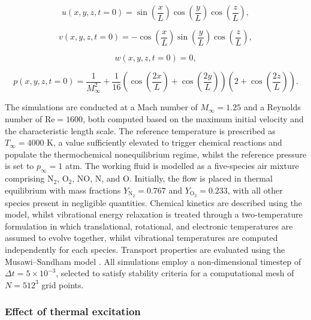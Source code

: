 \begin{equation}
u(x,y,z,t=0) = \sin\left(\frac{x}{L}\right)\cos\left(\frac{y}{L}\right)\cos\left(\frac{z}{L}\right),
\end{equation}

\begin{equation}
v(x,y,z,t=0) = -\cos\left(\frac{x}{L}\right)\sin\left(\frac{y}{L}\right)\cos\left(\frac{z}{L}\right),
\end{equation}

\begin{equation}
w(x,y,z,t=0) = 0,
\end{equation}

\begin{equation}
p(x,y,z,t=0) = \frac{1}{M_{\infty}^2} + \frac{1}{16}\left(\cos\left(\frac{2x}{L}\right) + \cos\left(\frac{2y}{L}\right)\right)\left(2 + \cos\left(\frac{2z}{L}\right)\right).
\end{equation}

The simulations are conducted at a Mach number of $M_{\infty} = 1.25$ and a Reynolds number of $\text{Re} = 1600$, both computed based on the maximum initial velocity and the characteristic length scale. The reference temperature is prescribed as $T_{\infty} = 4000$ K, a value sufficiently elevated to trigger chemical reactions and populate the thermochemical nonequilibrium regime, whilst the reference pressure is set to $p_{\infty} = 1$ atm. The working fluid is modelled as a five-species air mixture comprising N$_2$, O$_2$, NO, N, and O. Initially, the flow is placed in thermal equilibrium with mass fractions $Y_{\text{N}_2} = 0.767$ and $Y_{\text{O}_2} = 0.233$, with all other species present in negligible quantities. Chemical kinetics are described using the \citep{Park1990} model, whilst vibrational energy relaxation is treated through a two-temperature formulation in which translational, rotational, and electronic temperatures are assumed to evolve together, whilst vibrational temperatures are computed independently for each species. Transport properties are evaluated using the Musawi--Sandham model \citep{Musawi2025}. All simulations employ a non-dimensional timestep of $\Delta t = 5 \times 10^{-3}$, selected to satisfy stability criteria for a computational mesh of $N = 512^3$ grid points.

\subsubsection{Effect of thermal excitation}

